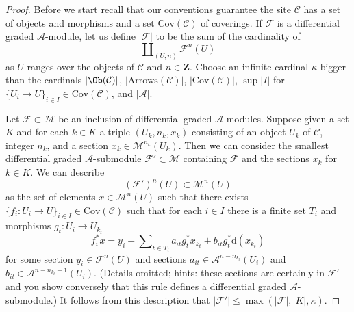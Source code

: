 \begin{proof}
Before we start recall that our conventions guarantee the site $\mathcal{C}$
has a set of objects and morphisms and a set $\text{Cov}(\mathcal{C})$
of coverings.
If $\mathcal{F}$
is a differential graded $\mathcal{A}$-module, let us define $|\mathcal{F}|$
to be the sum of the cardinality of
$$
\coprod\nolimits_{(U, n)} \mathcal{F}^n(U)
$$
as $U$ ranges over the objects of $\mathcal{C}$ and $n \in \mathbf{Z}$.
Choose an infinite cardinal $\kappa$ bigger than
the cardinals $|\Ob(\mathcal{C})|$, $|\text{Arrows}(\mathcal{C})|$,
$|\text{Cov}(\mathcal{C})|$, $\sup |I|$ for
$\{U_i \to U\}_{i \in I} \in \text{Cov}(\mathcal{C})$,
and $|\mathcal{A}|$.

\medskip\noindent
Let $\mathcal{F} \subset \mathcal{M}$ be an inclusion of
differential graded $\mathcal{A}$-modules.
Suppose given a set $K$ and for each $k \in K$ a triple
$(U_k, n_k, x_k)$ consisting of an object $U_k$ of $\mathcal{C}$,
integer $n_k$, and a section $x_k \in \mathcal{M}^{n_k}(U_k)$.
Then we can consider the smallest differential graded
$\mathcal{A}$-submodule $\mathcal{F}' \subset \mathcal{M}$
containing $\mathcal{F}$ and the sections $x_k$ for $k \in K$.
We can describe
$$
(\mathcal{F}')^n(U) \subset \mathcal{M}^n(U)
$$
as the set of elements $x \in \mathcal{M}^n(U)$ such that there
exists $\{f_i : U_i \to U\}_{i \in I} \in \text{Cov}(\mathcal{C})$ such that
for each $i \in I$ there is a finite set $T_i$ and morphisms
$g_t : U_i \to U_{k_t}$
$$
f_i^*x = y_i +
\sum\nolimits_{t \in T_i} a_{it}g_t^*x_{k_t} + b_{it}g_t^*\text{d}(x_{k_t})
$$
for some section $y_i \in \mathcal{F}^n(U)$ and
sections $a_{it} \in \mathcal{A}^{n - n_{k_t}}(U_i)$
and $b_{it} \in \mathcal{A}^{n - n_{k_t} - 1}(U_i)$.
(Details omitted; hints: these sections are certainly in $\mathcal{F}'$
and you show conversely that this rule defines a differential
graded $\mathcal{A}$-submodule.)
It follows from this description that
$|\mathcal{F}'| \leq \max(|\mathcal{F}|, |K|, \kappa)$.


\end{proof}
